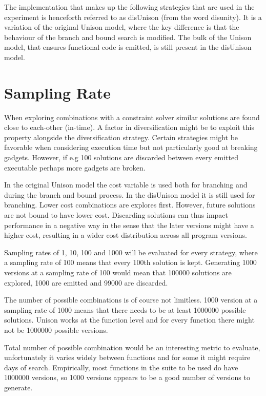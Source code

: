 The implementation that makes up the following strategies that are used in the experiment
is henceforth referred to as disUnison (from the word disunity). It is a variation of the
original Unison model, where the key difference is that the behaviour of the branch and
bound search is modified. The bulk of the Unison model, that ensures functional code is
emitted, is still present in the disUnison model.



\section{Sampling Rate}
\label{sec:sampling_rate}

When exploring combinations with a constraint solver similar solutions are found close to
each-other (in-time). A factor in diversification might be to exploit this property
alongside the diversification strategy. Certain strategies might be favorable when
considering execution time but not particularly good at breaking gadgets. However, if
e.g 100 solutions are discarded between every emitted executable perhaps more gadgets are
broken.

In the original Unison model the cost variable is used both for branching and during the
branch and bound process. In the disUnison model it is still used for branching. Lower
cost combinations are explores first. However, future solutions are not bound to have
lower cost. Discarding solutions can thus impact performance in a negative way in the
sense that the later versions might have a higher cost, resulting in a wider cost
distribution across all program versions.

Sampling rates of 1, 10, 100 and 1000 will be evaluated for every strategy, where a
sampling rate of 100 means that every 100th solution is kept. Generating 1000 versions
at a sampling rate of 100 would mean that 100000 solutions are explored, 1000 are emitted
and 99000 are discarded.

The number of possible combinations is of course not limitless. 1000 version at a sampling
rate of 1000 means that there needs to be at least 1000000 possible solutions. Unison works
at the function level and for every function there might not be 1000000 possible versions.

Total number of possible combination would be an interesting metric to evaluate, unfortunately
it varies widely between functions and for some it might require days of search. Empirically,
most functions in the suite to be used do have 1000000 versions, so 1000 versions appears
to be a good number of versions to generate.

